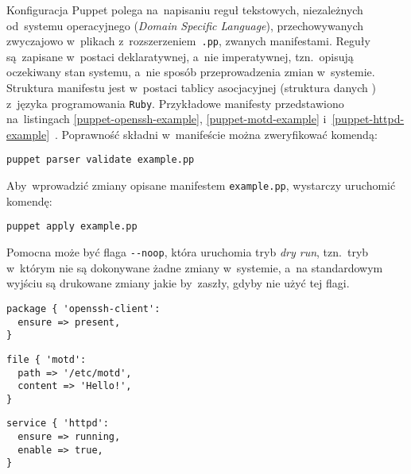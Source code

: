 \documentclass[thesis]{subfiles}
\begin{document}
Konfiguracja Puppet polega na~napisaniu reguł tekstowych, niezależnych od~systemu operacyjnego (\emph{Domain Specific Language}), przechowywanych zwyczajowo w~plikach z~rozszerzeniem~\texttt{.pp}, zwanych manifestami. Reguły są~zapisane w~postaci deklaratywnej, a~nie imperatywnej, tzn.~opisują oczekiwany stan systemu, a~nie sposób przeprowadzenia zmian w~systemie. Struktura manifestu jest w~postaci tablicy asocjacyjnej (struktura danych ) z~języka programowania \texttt{Ruby}. Przykładowe manifesty przedstawiono na~listingach \ref{puppet-openssh-example}, \ref{puppet-motd-example} i~\ref{puppet-httpd-example}~\cite{puppet-examples}. Poprawność składni w~manifeście  można zweryfikować komendą:
\begin{center}
\texttt{puppet parser validate example.pp}
\end{center}

Aby~wprowadzić zmiany opisane manifestem \texttt{example.pp}, wystarczy uruchomić komendę:
\begin{center}
\texttt{puppet apply example.pp}
\end{center}

Pomocna może być flaga \texttt{-{}-noop}, która uruchomia tryb \emph{dry run}, tzn.~tryb w~którym nie są dokonywane żadne zmiany w~systemie, a~na standardowym wyjściu są drukowane zmiany jakie by~zaszły, gdyby nie użyć tej flagi.

\begin{lstlisting}[numbers=none,caption={Manifest Puppet gwarantujący, że pakiet \texttt{openssh-client}, dostarczający klienta SSH, jest zainstalowany},label=puppet-openssh-example]
package { 'openssh-client':
  ensure => present,
}
\end{lstlisting}

\begin{lstlisting}[numbers=none,caption={Manifest Puppet gwarantujący istnienie pliku \hreftt{https://en.wikipedia.org/wiki/Motd_(Unix)}{/etc/motd} z~komunikatem \texttt{Hello!}, który wyświetla się~użytkownikom systemu po~zalogowaniu},label=puppet-motd-example]
file { 'motd':
  path => '/etc/motd',
  content => 'Hello!',
}
\end{lstlisting}

\begin{lstlisting}[numbers=none,caption={Manifest Puppet gwarantujący, że \gls{demon} \hreftt{https://httpd.apache.org/}{httpd} jest włączony i~działa},label=puppet-httpd-example]
service { 'httpd':
  ensure => running,
  enable => true,
}
\end{lstlisting}
\end{document}
